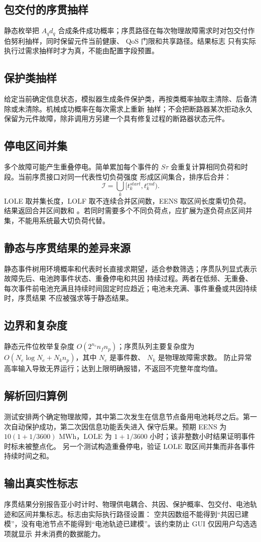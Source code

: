 \subsection{包交付的序贯抽样}
静态枚举把 $A_qd_q$ 合成条件成功概率；序贯路径在每次物理故障需求时对包交付作伯努利抽样，同时保留元件当前健康、
QoS 门限和共享路径。结果标志  只有实际执行过需求抽样时才为真，不能由配置字段预置。

\subsection{保护类抽样}
给定当前确定信息状态，模拟器生成条件保护类，再按类概率抽取主清除、后备清除或未清除。机械成功概率在每次需求上重新
抽样；不会把断路器某次拒动永久保留为元件故障，除非调用方另建一个具有修复过程的断路器状态元件。

\subsection{停电区间并集}
多个故障可能产生重叠停电。简单累加每个事件的 $S\tau$ 会重复计算相同负荷和时段。当前序贯接口对同一代表性切负荷强度
形成区间集合，排序后合并：
\begin{equation}
 \mathcal I=\bigcup_k[t_k^{start},t_k^{end}).
\end{equation}
LOLE 取并集长度，LOLF 取不连续合并区间数，EENS 取区间长度乘切负荷。结果返回合并区间数和
。若同时需要多个不同负荷点，应扩展为逐负荷点区间并集，不能用系统最大切负荷代替。

\subsection{静态与序贯结果的差异来源}
静态事件树用环境概率和代表时长直接求期望，适合参数筛选；序贯队列显式表示故障先后、电池跨事件状态、重叠停电和共因
持续过程。两者在低频、无重叠、每次事件前电池充满且持续时间固定时应趋近；电池未充满、事件重叠或共因持续时，序贯结果
不应被强求等于静态结果。

\subsection{边界和复杂度}
静态元件位枚举复杂度 $O(2^{n_c}n_fn_p)$；序贯队列主要复杂度为 $O(N_e\log N_e+N_kn_p)$，其中 $N_e$ 是事件数、
$N_k$ 是物理故障需求数。 防止异常高率输入导致无界运行；达到上限明确报错，不返回不完整年度均值。

\subsection{解析回归算例}
测试安排两个确定物理故障，其中第二次发生在信息节点备用电池耗尽之后。第一次自动保护成功，第二次因信息功能丢失进入
保守后果。预期 EENS 为 $10(1+1/3600)$ MWh，LOLE 为 $1+1/3600$ 小时；该非整数小时结果证明事件时标未被整点化。
另一个测试构造重叠停电，验证 LOLE 取区间并集而非各事件持续时间之和。

\subsection{输出真实性标志}
序贯结果分别报告亚小时计时、物理供电耦合、共因、保护概率、包交付、电池轨迹和区间并集标志。标志由实际执行路径设置：
空共因数组不能得到“共因已建模”，没有电池节点不能得到“电池轨迹已建模”。该约束防止 GUI 仅因用户勾选选项就显示
并未消费的数据能力。
